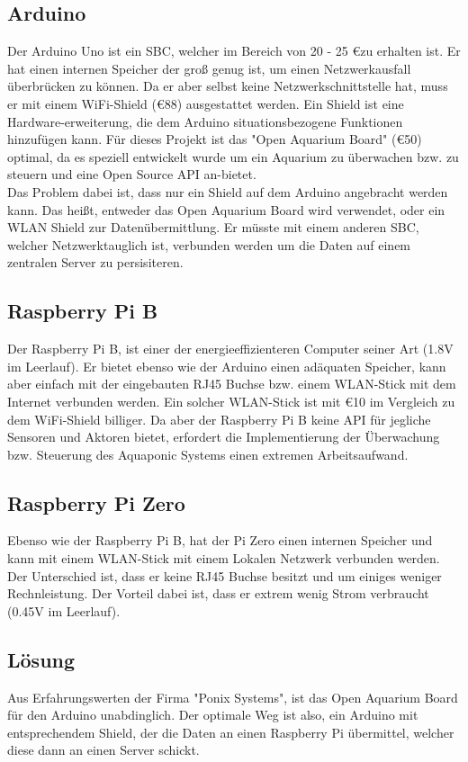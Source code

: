 \documentclass[11pt]{article}
\begin{document}
\subsection{Arduino}
Der Arduino Uno ist ein SBC, welcher im Bereich von 20 - 25 \euro zu erhalten ist. Er hat einen internen Speicher der gro{\ss} genug ist, um einen Netzwerkausfall \"uberbr\"ucken zu k\"onnen. Da er aber selbst keine Netzwerkschnittstelle hat, muss er mit einem WiFi-Shield (\euro 88) ausgestattet werden. Ein Shield ist eine Hardware-erweiterung, die dem Arduino situationsbezogene Funktionen hinzuf\"ugen kann. F\"ur dieses Projekt ist das "Open Aquarium Board" (\euro 50) optimal, da es speziell entwickelt wurde um ein Aquarium zu \"uberwachen bzw. zu steuern und eine Open Source API an-bietet. \\
Das Problem dabei ist, dass nur ein Shield auf dem Arduino angebracht werden kann. Das hei{\ss}t, entweder das Open Aquarium Board wird verwendet, oder ein WLAN Shield zur Daten\"ubermittlung. Er m\"usste mit einem anderen SBC, welcher Netzwerktauglich ist, verbunden werden um die Daten auf einem zentralen Server zu persisiteren.
\subsection{Raspberry Pi B}
Der Raspberry Pi B, ist einer der energieeffizienteren Computer seiner Art (1.8V im Leerlauf). Er bietet ebenso wie der Arduino einen ad\"aquaten Speicher, kann aber einfach mit der eingebauten RJ45 Buchse bzw. einem WLAN-Stick mit dem Internet verbunden werden. Ein solcher WLAN-Stick ist mit \euro 10 im Vergleich zu dem WiFi-Shield billiger. Da aber der Raspberry Pi B keine API f\"ur jegliche Sensoren und Aktoren bietet, erfordert die Implementierung der \"Uberwachung bzw. Steuerung des Aquaponic Systems einen extremen Arbeitsaufwand.
\newpage
\subsection{Raspberry Pi Zero}
Ebenso wie der Raspberry Pi B, hat der Pi Zero einen internen Speicher und kann mit einem WLAN-Stick mit einem Lokalen Netzwerk verbunden werden. Der Unterschied ist, dass er keine RJ45 Buchse besitzt und um einiges weniger Rechnleistung. Der Vorteil dabei ist, dass er extrem wenig Strom verbraucht (0.45V im Leerlauf).
\subsection{L\"osung}
Aus Erfahrungswerten der Firma "Ponix Systems", ist das Open Aquarium Board f\"ur den Arduino unabdinglich. Der optimale Weg ist also, ein Arduino mit entsprechendem Shield, der die Daten an einen Raspberry Pi \"ubermittel, welcher diese dann an einen Server schickt.
\end{document}
